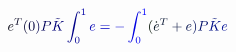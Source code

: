 \documentclass[12pt]{article}
\begin{document}
\makeatletter
\renewcommand*{\@textcolor}[3]{%
  \protect\leavevmode
  \begingroup
    \color#1{#2}#3%
  \endgroup
}
\makeatother
\begin{displaymath}
\mathcolor[RGB]{0,0,15}{e} ^ { \mathcolor[RGB]{0,0,30}{T} } \mathcolor[RGB]{0,0,45}{(} \mathcolor[RGB]{0,0,60}{0} \mathcolor[RGB]{0,0,75}{)} \mathcolor[RGB]{0,0,90}{P} \mathcolor[RGB]{0,0,105}{\tilde { \mathcolor[RGB]{0,0,120}{K} } } \mathcolor[RGB]{0,0,135}{\int} _ { \mathcolor[RGB]{0,0,150}{0} } ^ { \mathcolor[RGB]{0,0,165}{1} } \mathcolor[RGB]{0,0,180}{e} \mathcolor[RGB]{0,0,195}{=} \mathcolor[RGB]{0,0,210}{-} \mathcolor[RGB]{0,0,225}{\int} _ { \mathcolor[RGB]{0,0,240}{0} } ^ { \mathcolor[RGB]{0,0,255}{1} } \mathcolor[RGB]{0,15,0}{(} \mathcolor[RGB]{0,15,15}{\dot { \mathcolor[RGB]{0,15,30}{e} } } ^ { \mathcolor[RGB]{0,15,45}{T} } \mathcolor[RGB]{0,15,60}{+} \mathcolor[RGB]{0,15,75}{e} \mathcolor[RGB]{0,15,90}{)} \mathcolor[RGB]{0,15,105}{P} \mathcolor[RGB]{0,15,120}{\tilde { \mathcolor[RGB]{0,15,135}{K} } } \mathcolor[RGB]{0,15,150}{e}
\end{displaymath}
\end{document}
